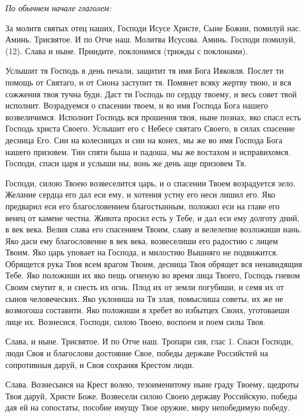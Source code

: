 \itshape По обычнем начале глаголем:\normalfont{}


За молитв святых отец наших, Господи Исусе Христе, Сыне Божии, помилуй нас. Аминь. Трисвятое. И по Отче наш. Молитва Исусова. Аминь. Господи помилуй, (12). Слава и ныне. Приидите, поклонимся (трижды с поклонами).




Услышит тя Господь в день печали, защитит тя имя Бога Ияковля. Послет ти помощь от Святаго, и от Сиона заступит тя. Помянет всяку жертву твою, и вся сожжения твоя тучна буди. Даст ти Господь по сердцу твоему, и весь совет твой исполнит. Возрадуемся о спасении твоем, и во имя Господа Бога нашего возвеличимся. Исполнит Господь вся прошения твоя, ныне познах, яко спасл есть Господь христа Своего. Услышит его с Небесе святаго Своего, в силах спасение десница Его. Сии на колесницах и сии на конех, мы же во имя Господа Бога нашего призовем. Тии спяти быша и падоша, мы же востахом и исправихомся. Господи, спаси царя и услыши ны, вонь же день аще призовем Тя. 




Господи, силою Твоею возвеселится царь, и о спасении Твоем возрадуется зело. Желание сердца его дал еси ему, и хотения устну его неси лишил его. Яко предварил еси его благословением благостынным, положил еси на главе его венец от камене честна. Живота просил есть у Тебе, и дал еси ему долготу дний, в век века. Велия слава его спасением Твоим, славу и велелепие возложиши нань. Яко даси ему благословение в век века, возвеселиши его радостию с лицем Твоим. Яко царь уповает на Господа, и милостию Вышняго не подвижится. Обрящется рука Твоя всем врагом Твоим, десница Твоя обрящет вся ненавидящия Тебе. Яко положиши их яко пещь огненую во время лица Твоего, Господь гневом Своим смутит я, и снесть их огнь. Плод их от земли погубиши, и семя их от сынов человеческих. Яко уклониша на Тя злая, помыслиша советы, их же не возмогоша составити. Яко положиши я хребет во избытцех Своих, уготоваеши лице их. Вознесися, Господи, силою Твоею, воспоем и поем силы Твоя. 

Слава, и ныне. Трисвятое. И по Отче наш. Тропари сия, глас 1. Спаси Господи, люди Своя и благослови достояние Свое, победы державе Российстей на сопротивныя даруй, и Своя сохраняя Крестом люди.

Слава. Вознесыися на Крест волею, тезоименитому ныне граду Твоему, щедроты Твоя даруй, Христе Боже. Возвесели силою Своею державу Российскую, победы дая ей на сопостаты, пособие имущу Твое оружие, миру непобедимую победу.

